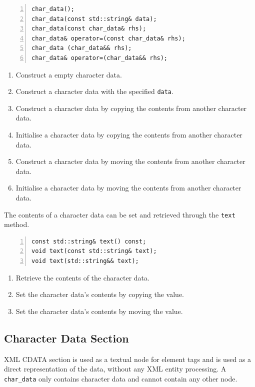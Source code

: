 \documentclass[10pt,a4paper,openany]{mudbook}
\makeatletter
\newcommand{\indextt}[2][]{\texttt{#2}\index{#2@\texttt{#2}#1}}
\newenvironment{enumeratedef}
  {\begin{enumerate}[topsep=0.5em,itemsep=0em,parsep=0em,font=\small]
     \small}
  {\end{enumerate}}
\makeatother
\begin{document}
\begin{lstlisting}[style=definition,numbers=left]
char_data();
char_data(const std::string& data);
char_data(const char_data& rhs);
char_data& operator=(const char_data& rhs);
char_data (char_data&& rhs);
char_data& operator=(char_data&& rhs);
\end{lstlisting}
\begin{enumeratedef}
  \item Construct a empty character data.
  \item Construct a character data with the specified \texttt{data}.
  \item Construct a character data by copying the contents from another
        character data.
  \item Initialise a character data by copying the contents from another
        character data.
  \item Construct a character data by moving the contents from another
        character data.
  \item Initialise a character data by moving the contents from another
        character data.
\end{enumeratedef}

The contents of a character data can be set and retrieved through the
\indextt{text} method.

\begin{lstlisting}[style=definition,numbers=left]
const std::string& text() const;
void text(const std::string& text);
void text(std::string&& text);
\end{lstlisting}
\begin{enumeratedef}
  \item Retrieve the contents of the character data.
  \item Set the character data's contents by copying the value.
  \item Set the character data's contents by moving the value.
\end{enumeratedef}

\subsection{Character Data Section}

XML CDATA section is used as a textual node for element tags and is used as
a direct representation of the data, without any XML entity processing. A
\indextt{char\_data} only contains character data and cannot contain any
other node.
\end{document}

